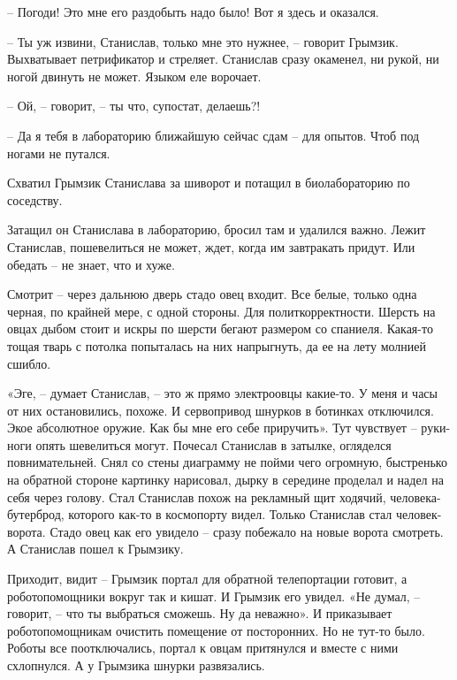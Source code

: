 \documentclass[ebook,oneside,final,openright]{memoir}
\begin{document}
– Погоди! Это мне его раздобыть надо было! Вот я здесь и оказался.\par
– Ты уж извини, Станислав, только мне это нужнее, – говорит Грымзик. Выхватывает петрификатор и стреляет. Станислав сразу окаменел, ни рукой, ни ногой двинуть не может. Языком еле ворочает.\par
– Ой, – говорит, – ты что, супостат, делаешь?!\par
– Да я тебя в лабораторию ближайшую сейчас сдам – для опытов. Чтоб под ногами не путался.\par
Схватил Грымзик Станислава за шиворот и потащил в биолабораторию по соседству.\par
\par
Затащил он Станислава в лабораторию, бросил там и удалился важно. Лежит Станислав, пошевелиться не может, ждет, когда им завтракать придут. Или обедать – не знает, что и хуже. \par
Смотрит – через дальнюю дверь стадо овец входит. Все белые, только одна черная, по крайней мере, с одной стороны. Для политкорректности. Шерсть на овцах дыбом стоит и искры по шерсти бегают размером со спаниеля. Какая-то тощая тварь с потолка попыталась на них напрыгнуть, да ее на лету молнией сшибло.\par
\par
«Эге, – думает Станислав, – это ж прямо электроовцы какие-то. У меня и часы от них остановились, похоже. И сервопривод шнурков в ботинках отключился. Экое абсолютное оружие. Как бы мне его себе приручить». Тут чувствует – руки-ноги опять шевелиться могут. Почесал Станислав в затылке, огляделся повнимательней. Снял со стены диаграмму не пойми чего огромную, быстренько на обратной стороне картинку нарисовал, дырку в середине проделал и надел на себя через голову. Стал Станислав похож на рекламный щит ходячий, человека-бутерброд, которого как-то в космопорту видел. Только Станислав стал человек-ворота. Стадо овец как его увидело – сразу побежало на новые ворота смотреть. А Станислав пошел к Грымзику.\par
\par
Приходит, видит – Грымзик портал для обратной телепортации готовит, а роботопомощники вокруг так и кишат. И Грымзик его увидел. «Не думал, – говорит, – что ты выбраться сможешь. Ну да неважно». И приказывает роботопомощникам очистить помещение от посторонних. Но не тут-то было. Роботы все поотключались, портал к овцам притянулся и вместе с ними схлопнулся. А у Грымзика шнурки развязались.\par
\par
\end{document}
